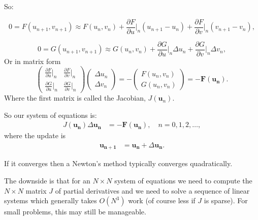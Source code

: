 \documentclass[12pt, a4paper]{article}
\renewcommand{\vec}[1]{\mathbf{#1}}
\theoremstyle{definition}
\theoremstyle{remark}
\numberwithin{equation}{section}
\begin{document}
So:

\begin{equation*}
0=F(u_{n+1},v_{n+1}) \approx F(u_n,v_n) + \frac{\partial F}{\partial u} \bigg|_n(u_{n+1}-u_n) + \frac{\partial F}{\partial v}\bigg|_n (v_{n+1} - v_n),
\end{equation*}

\begin{equation*}
0=G(u_{n+1},v_{n+1}) \approx G(u_n,v_n) + \frac{\partial G}{\partial u} \bigg|_n\Delta u_n + \frac{\partial G}{\partial v}\bigg|_n \Delta v_n,
\end{equation*}
Or in matrix form
\begin{equation*}
\begin{pmatrix}
\frac{\partial F}{\partial u}\big|_n & \frac{\partial F}{\partial v}\big|_n\\
\frac{\partial G}{\partial u}\big|_n & \frac{\partial G}{\partial v}\big|_n
\end{pmatrix}
\begin{pmatrix}
\Delta u_n\\
\Delta v_n
\end{pmatrix}
=-
\begin{pmatrix}
F(u_n,v_n)\\
G(u_n,v_n)
\end{pmatrix}
=-
\vec{F}(\vec{u_n}).
\end{equation*}
Where the first matrix is called the Jacobian, $J(\vec{u}_n)$.

So our system of equations is:
\begin{align*}
{J}(\vec{u_n})\Delta \vec{u_n} &= -\vec{F}(\vec{u_n}), \quad n=0,1,2,\dots,
\end{align*}
where the update is 
\begin{align*}
\vec{u_{n+1}}&=\vec{u_n} + \Delta \vec{u_n}.
\end{align*}

If it converges then a Newton's method typically converges quadratically.

The downside is that for an $N \times N$ system of equations we need to compute the $N \times N$ matrix $J$ of partial derivatives and we need to solve a sequence of linear systems which generally takes $O(N^3)$ work (of course less if $J$ is sparse). For small problems, this may still be manageable. 
\end{document}
